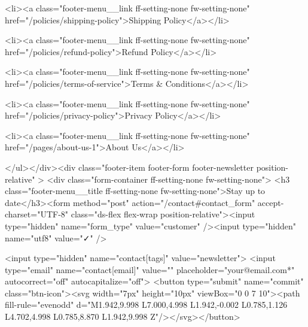 {{{{{{{                  <li><a class="footer-menu__link ff-setting-none fw-setting-none" href="/policies/shipping-policy">Shipping Policy</a></li>
                
                  <li><a class="footer-menu__link ff-setting-none fw-setting-none" href="/policies/refund-policy">Refund Policy</a></li>
                
                  <li><a class="footer-menu__link ff-setting-none fw-setting-none" href="/policies/terms-of-service">Terms & Conditions</a></li>
                
                  <li><a class="footer-menu__link ff-setting-none fw-setting-none" href="/policies/privacy-policy">Privacy Policy</a></li>
                
                  <li><a class="footer-menu__link ff-setting-none fw-setting-none" href="/pages/about-us-1">About Us</a></li>
                
              </ul></div><div class="footer-item footer-form footer-newsletter position-relative" >
            <div class="form-container ff-setting-none fw-setting-none">
              <h3 class="footer-menu__title ff-setting-none fw-setting-none">Stay up to date</h3><form method="post" action="/contact#contact_form" accept-charset="UTF-8" class="ds-flex flex-wrap position-relative"><input type="hidden" name="form_type" value="customer" /><input type="hidden" name="utf8" value="✓" />
                  


                  
                    <input type="hidden" name="contact[tags]" value="newsletter">
                    <input type="email" name="contact[email]" value="" placeholder="your@email.com*" autocorrect="off" autocapitalize="off">
                    <button type="submit" name="commit" class="btn-icon"><svg width="7px" height="10px" viewBox="0 0 7 10"><path fill-rule="evenodd" d="M1.942,9.998 L7.000,4.998 L1.942,-0.002 L0.785,1.126 L4.702,4.998 L0.785,8.870 L1.942,9.998 Z"/></svg></button>
                  
}}}}}}}

